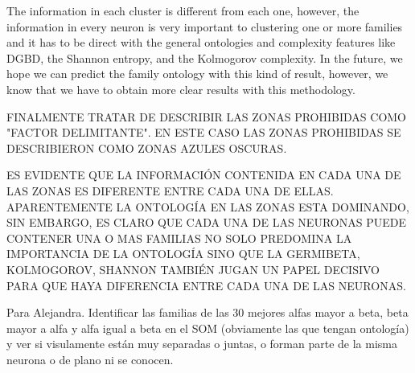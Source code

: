 \documentclass[preprint,12pt]{elsarticle}
\begin{document}
The information in each cluster is different from each one, 
however, the information in every neuron is very important to 
clustering one or more families and it has to be direct with 
the general ontologies and complexity features like DGBD, 
the Shannon entropy, and the Kolmogorov complexity. In the 
future, we hope we can predict the family ontology with this 
kind of result, however, we know that we have to obtain more 
clear results with this methodology.  


\bigbreak
\par FINALMENTE TRATAR DE DESCRIBIR LAS ZONAS PROHIBIDAS COMO "FACTOR DELIMITANTE". EN ESTE CASO LAS ZONAS PROHIBIDAS SE DESCRIBIERON COMO ZONAS AZULES OSCURAS. \par 

ES EVIDENTE QUE LA INFORMACIÓN CONTENIDA EN CADA UNA DE LAS ZONAS ES DIFERENTE ENTRE CADA UNA DE ELLAS. APARENTEMENTE LA ONTOLOGÍA EN LAS ZONAS ESTA DOMINANDO, SIN EMBARGO, ES CLARO QUE CADA UNA DE LAS NEURONAS PUEDE CONTENER UNA O MAS FAMILIAS NO SOLO PREDOMINA LA IMPORTANCIA DE LA ONTOLOGÍA SINO QUE LA GERMIBETA, KOLMOGOROV, SHANNON TAMBIÉN JUGAN UN PAPEL DECISIVO PARA QUE HAYA DIFERENCIA ENTRE CADA UNA DE LAS NEURONAS. \par 

Para Alejandra. Identificar las familias de las 30 mejores alfas mayor a beta, beta mayor a alfa y alfa igual a beta en el SOM  (obviamente las que tengan ontología) y ver si visulamente están muy separadas o juntas, o forman parte de la misma neurona o de plano ni se conocen. \par


\clearpage
\end{document}
